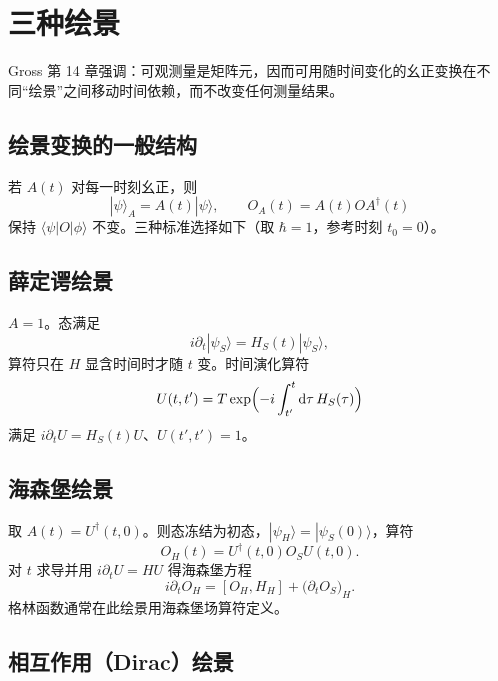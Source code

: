 \section{三种绘景}

Gross 第 14 章强调：可观测量是矩阵元，因而可用随时间变化的幺正变换在不同“绘景”之间移动时间依赖，而不改变任何测量结果。

\subsection{绘景变换的一般结构}

若 $A(t)$ 对每一时刻幺正，则
\begin{equation}
  |\psi\rangle_A=A(t)|\psi\rangle,
  \qquad
  O_A(t)=A(t)O A^\dagger(t)
\end{equation}
保持 $\langle\psi|O|\phi\rangle$ 不变。三种标准选择如下（取 $\hbar=1$，参考时刻 $t_0=0$）。

\subsection{薛定谔绘景}

$A=1$。态满足
\begin{equation}
  i\partial_t|\psi_S\rangle=H_S(t)|\psi_S\rangle,
\end{equation}
算符只在 $H$ 显含时间时才随 $t$ 变。时间演化算符
\begin{equation}
  U(t,t')
  =T\exp\Bigl(-i\int_{t'}^{t}\mathrm{d}\tau\,H_S(\tau)\Bigr)
\end{equation}
满足 $i\partial_t U=H_S(t)U$、$U(t',t')=1$。

\subsection{海森堡绘景}

取 $A(t)=U^\dagger(t,0)$。则态冻结为初态，$|\psi_H\rangle=|\psi_S(0)\rangle$，算符
\begin{equation}
  O_H(t)=U^\dagger(t,0)O_S U(t,0).
\end{equation}
对 $t$ 求导并用 $i\partial_t U=HU$ 得海森堡方程
\begin{equation}
  i\partial_t O_H
  =[O_H,H_H]
  +\bigl(\partial_t O_S\bigr)_H.
\end{equation}
格林函数通常在此绘景用海森堡场算符定义。

\subsection{相互作用（Dirac）绘景}

